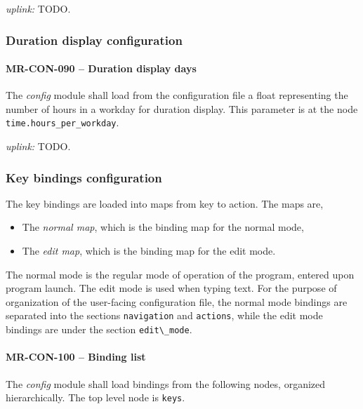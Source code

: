 \textit{uplink: } TODO.

\subsubsection{Duration display configuration}
\paragraph{MR-CON-090 -- Duration display days}
The \emph{config} module shall load from the configuration file a float
representing the number of hours in a workday for duration display.
This parameter is at the node \lstinline{time.hours_per_workday}.

\textit{uplink: } TODO.

\subsubsection{Key bindings configuration}
The key bindings are loaded into maps from key to action. The maps are,
\begin{itemize}
\item The \emph{normal map}, which is the binding map for the normal mode,
\item The \emph{edit map}, which is the binding map for the edit mode.
\end{itemize}

The normal mode is the regular mode of operation of the program, entered
upon program launch. The edit mode is used when typing text.
For the purpose of organization of the user-facing configuration file,
the normal mode bindings are separated into the sections \lstinline{navigation}
and \lstinline{actions}, while the edit mode bindings are under the section
\lstinline{edit\_mode}.

\paragraph{MR-CON-100 -- Binding list}
The \emph{config} module shall load bindings from the following nodes,
organized hierarchically. The top level node is \lstinline{keys}.

